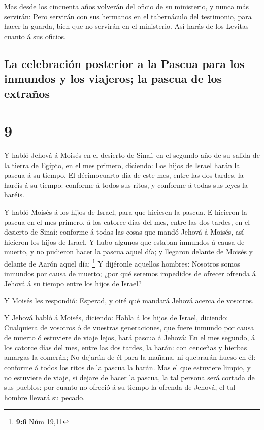  Mas desde los cincuenta años volverán del oficio de su
ministerio, y nunca más servirán:  Pero servirán con sus
hermanos en el tabernáculo del testimonio, para hacer la guarda, bien
que no servirán en el ministerio. Así harás de los Levitas cuanto á sus
oficios.

\hypertarget{la-celebraciuxf3n-posterior-a-la-pascua-para-los-inmundos-y-los-viajeros-la-pascua-de-los-extrauxf1os}{%
\subsection{La celebración posterior a la Pascua para los inmundos y los
viajeros; la pascua de los
extraños}\label{la-celebraciuxf3n-posterior-a-la-pascua-para-los-inmundos-y-los-viajeros-la-pascua-de-los-extrauxf1os}}

\hypertarget{section-8}{%
\section{9}\label{section-8}}

 Y habló Jehová á Moisés en el desierto de Sinaí, en el
segundo año de su salida de la tierra de Egipto, en el mes primero,
diciendo:  Los hijos de Israel harán la pascua á su tiempo.
 El décimocuarto día de este mes, entre las dos tardes, la
haréis á su tiempo: conforme á todos sus ritos, y conforme á todas sus
leyes la haréis.

 Y habló Moisés á los hijos de Israel, para que hiciesen la
pascua.  E hicieron la pascua en el mes primero, á los
catorce días del mes, entre las dos tardes, en el desierto de Sinaí:
conforme á todas las cosas que mandó Jehová á Moisés, así hicieron los
hijos de Israel.  Y hubo algunos que estaban inmundos á
causa de muerto, y no pudieron hacer la pascua aquel día; y llegaron
delante de Moisés y delante de Aarón aquel día; \footnote{\textbf{9:6}
  Núm 19,11}  Y dijéronle aquellos hombres: Nosotros somos
inmundos por causa de muerto; ¿por qué seremos impedidos de ofrecer
ofrenda á Jehová á su tiempo entre los hijos de Israel?

 Y Moisés les respondió: Esperad, y oiré qué mandará Jehová
acerca de vosotros.

 Y Jehová habló á Moisés, diciendo:  Habla á
los hijos de Israel, diciendo: Cualquiera de vosotros ó de vuestras
generaciones, que fuere inmundo por causa de muerto ó estuviere de viaje
lejos, hará pascua á Jehová:  En el mes segundo, á los
catorce días del mes, entre las dos tardes, la harán: con cenceñas y
hierbas amargas la comerán;  No dejarán de él para la
mañana, ni quebrarán hueso en él: conforme á todos los ritos de la
pascua la harán.  Mas el que estuviere limpio, y no
estuviere de viaje, si dejare de hacer la pascua, la tal persona será
cortada de sus pueblos: por cuanto no ofreció á su tiempo la ofrenda de
Jehová, el tal hombre llevará su pecado.

